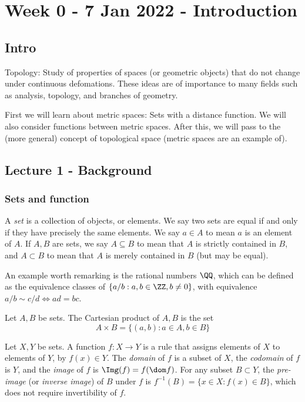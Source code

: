 \section{Week 0 - 7 Jan 2022 - Introduction}
\subsection{Intro}
Topology: Study of properties of spaces (or geometric objects) that do not
change under continuous defomations. These ideas are of importance to many
fields such as analysis, topology, and branches of geometry.

First we will learn about metric spaces: Sets with a distance function. We will
also consider functions between metric spaces. After this, we will pass to the
(more general) concept of topological space (metric spaces are an example of).

\subsection{Lecture 1 - Background}
\subsubsection{Sets and function}
\begin{definition}
  A \emph{set} is a collection of objects, or elements. We say two sets are
  equal if and only if they have precisely the same elements. We say $a\in
  A$ to mean $a$ is an element of $A$. If $A,B$ are sets, we say $A\subseteq B$ to
  mean that $A$ is strictly contained in $B$, and $A\subset B$ to mean that $A$
  is merely contained in $B$ (but may be equal). 
  \label{def:set}
\end{definition}
An example worth remarking is the rational numbers $\QQ$, which can be defined
as the equivalence classes of $\{a/b : a,b\in\ZZ, b\neq 0\}$, with equivalence
$a/b\sim c/d \iff ad=bc$.
\begin{definition}
  Let $A,B$ be sets. The Cartesian product of $A,B$ is the set 
  \[A\times B = \{(a,b) : a\in A, b\in B\}\]
  \label{def:cartesianProduct}
\end{definition}
\begin{definition}
  Let $X,Y$ be sets. A function $f:X\to Y$ is a rule that assigns elements of
  $X$ to elements of $Y$, by $f(x)\in Y$. The \emph{domain} of $f$ is a subset
  of $X$, the \emph{codomain} of $f$ is $Y$, and the \emph{image} of $f$ is
  $\Img(f)=f(\dom f)$. For any subset $B\subset Y$, the \emph{pre-image} (or
  \emph{inverse image}) of $B$ under $f$ is $f^{-1}(B)=\{x\in X:f(x)\in B\}$,
  which does not require invertibility of $f$.
  \label{def:function}
\end{definition}
